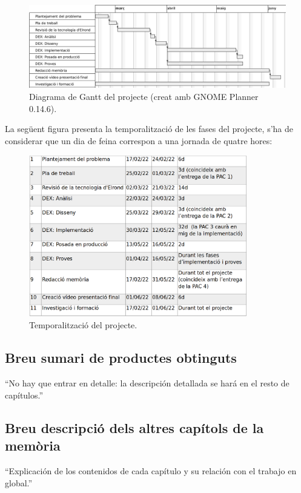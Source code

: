 \documentclass[11pt,a4paper]{article}
\begin{document}
\begin{figure}[h]
\includegraphics[width=1\textwidth]{gantt.png}
\centering
\caption{Diagrama de Gantt del projecte (creat amb GNOME Planner 0.14.6).}
\end{figure}

La següent figura presenta la temporalització de les fases del projecte, s'ha de considerar que un dia de feina correspon a una jornada de quatre hores:
\begin{figure}[h]
\includegraphics[width=0.85\textwidth]{gantttemp.png}
\centering
\caption{Temporalització del projecte.}
\end{figure} 

\subsection{Breu sumari de productes obtinguts}
``No hay que entrar en detalle: la descripción detallada se hará en el resto de capítulos.'' 
\medskip 

\subsection{Breu descripció dels altres capítols de la memòria}
``Explicación de los contenidos de cada capítulo y su relación con el trabajo en global.''
\end{document}
